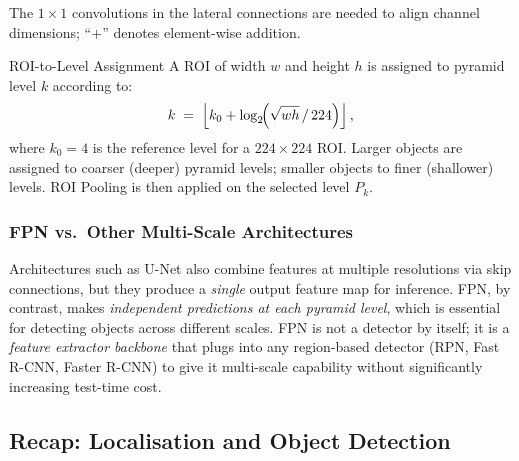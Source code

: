 \documentclass[11pt,a4paper]{article}
\begin{document}
The $1 \times 1$ convolutions in the lateral connections are needed to align channel dimensions; ``$+$'' denotes element-wise addition.

\begin{defbox}{ROI-to-Level Assignment}
A ROI of width $w$ and height $h$ is assigned to pyramid level $k$ according to:
\[
  k \;=\; \left\lfloor k_0 + \log_2\!\Bigl(\sqrt{wh}\,/\,224\Bigr) \right\rfloor,
\]
where $k_0 = 4$ is the reference level for a $224 \times 224$ ROI. Larger objects are assigned to coarser (deeper) pyramid levels; smaller objects to finer (shallower) levels. ROI Pooling is then applied on the selected level $P_k$.
\end{defbox}

\subsubsection{FPN vs.\ Other Multi-Scale Architectures}

Architectures such as U-Net also combine features at multiple resolutions via skip connections, but they produce a \emph{single} output feature map for inference. FPN, by contrast, makes \emph{independent predictions at each pyramid level}, which is essential for detecting objects across different scales. FPN is not a detector by itself; it is a \emph{feature extractor backbone} that plugs into any region-based detector (RPN, Fast R-CNN, Faster R-CNN) to give it multi-scale capability without significantly increasing test-time cost.

\subsection{Recap: Localisation and Object Detection}
\label{sec:recap_detection}
\end{document}
